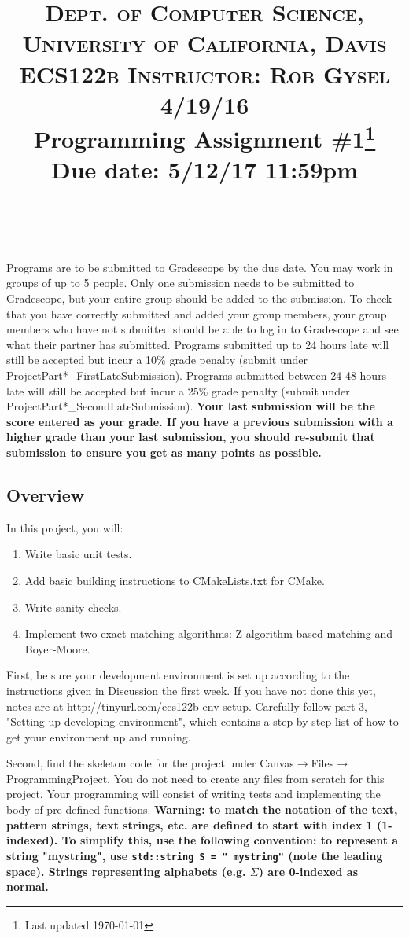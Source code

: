 \documentclass[paper=a4, fontsize=11pt]{scrartcl} %
\title{	
\normalfont \normalsize 
\textsc{Dept. of Computer Science, University of California, Davis\\ECS122b \hspace{.5in} Instructor: Rob Gysel \hspace{.5in} 4/19/16} %
\horrule{0.5pt} \\[0.4cm] %
\huge Programming Assignment \#1\footnote{Last updated \today}\\Due date: 5/12/17 11:59pm \\ %
\horrule{2pt} \\[0.5cm] %
}
\author{} %
\date{}
\numberwithin{equation}{section} %
\numberwithin{figure}{section} %
\numberwithin{table}{section} %
\begin{document}
\maketitle %
\vspace{-3cm}

Programs are to be submitted to Gradescope by the due date.
You may work in groups of up to 5 people.
Only one submission needs to be submitted to Gradescope, but your entire group should be added to the submission.
To check that you have correctly submitted and added your group members, your group members who have not submitted should be able to log in to Gradescope and see what their partner has submitted.
Programs submitted up to 24 hours late will still be accepted but incur a 10\% grade penalty (submit under ProjectPart*\_FirstLateSubmission).
Programs submitted between 24-48 hours late will still be accepted but incur a 25\% grade penalty (submit under ProjectPart*\_SecondLateSubmission).
\textbf{Your last submission will be the score entered as your grade.
If you have a previous submission with a higher grade than your last submission, you should re-submit that submission to ensure you get as many points as possible.}

\subsection*{Overview}
In this project, you will:
\begin{enumerate}
	\item Write basic unit tests.
	\item Add basic building instructions to CMakeLists.txt for CMake.
	\item Write sanity checks.
	\item Implement two exact matching algorithms: Z-algorithm based matching and Boyer-Moore.
\end{enumerate}

First, be sure your development environment is set up according to the instructions given in Discussion the first week.
If you have not done this yet, notes are at \url{http://tinyurl.com/ecs122b-env-setup}.
Carefully follow part 3, "Setting up developing environment", which contains a step-by-step list of how to get your environment up and running.

Second, find the skeleton code for the project under Canvas$\to$Files$\to$ProgrammingProject.
You do not need to create any files from scratch for this project.
Your programming will consist of writing tests and implementing the body of pre-defined functions.
\textbf{Warning: to match the notation of the text, pattern strings, text strings, etc. are defined to start with index 1 (1-indexed).
To simplify this, use the following convention: to represent a string "mystring", use \texttt{std::string S = " mystring"} (note the leading space).
Strings representing alphabets (e.g. $\Sigma$) are 0-indexed as normal.}
\end{document}
